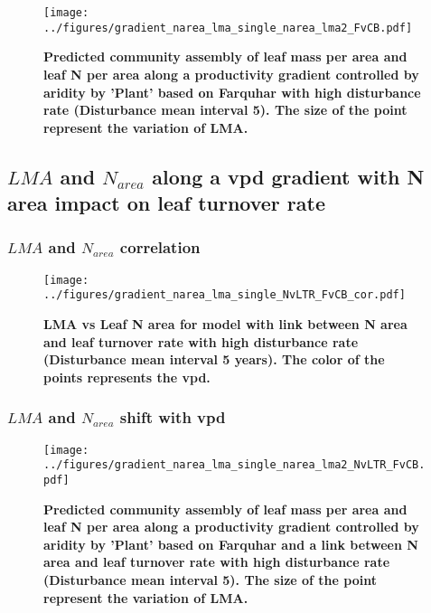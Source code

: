 \documentclass[a4paper,11pt]{article}
\begin{document}
\begin{figure}[ht]
\centering
\texttt{[image: ../figures/gradient\_narea\_lma\_single\_narea\_lma2\_FvCB.pdf]}
\caption{\textbf{Predicted community assembly of leaf mass per area and leaf N per area along a productivity gradient controlled by aridity by 'Plant' based on Farquhar with high disturbance rate (Disturbance mean interval 5). The size of the point represent the variation of LMA.}
\label{fig:lma_nareaFh2}}
\end{figure}




\clearpage

\subsection{$LMA$ and $N_{area}$ along a vpd gradient with N area impact on leaf turnover rate}

\subsubsection{$LMA$ and $N_{area}$ correlation}

\begin{figure}[ht]
\centering
\texttt{[image: ../figures/gradient\_narea\_lma\_single\_NvLTR\_FvCB\_cor.pdf]}
\caption{\textbf{LMA vs Leaf N area for model with link between N area and leaf turnover rate with high disturbance rate (Disturbance mean interval 5 years). The color of the points represents the vpd.}
\label{fig:lma_narea_cor_single_NvLTR}}
\end{figure}

\clearpage

\subsubsection{$LMA$ and $N_{area}$ shift with vpd}


\begin{figure}[ht] 
\centering
\texttt{[image: ../figures/gradient\_narea\_lma\_single\_narea\_lma2\_NvLTR\_FvCB.pdf]}
\caption{\textbf{Predicted community assembly of leaf mass per area and leaf N per area along a productivity gradient controlled by aridity by 'Plant' based on Farquhar and a link between N area and leaf turnover rate with high disturbance rate (Disturbance mean interval 5). The size of the point represent the variation of LMA.}
\label{fig:lma_nareaFh2}}
\end{figure}
\end{document}
